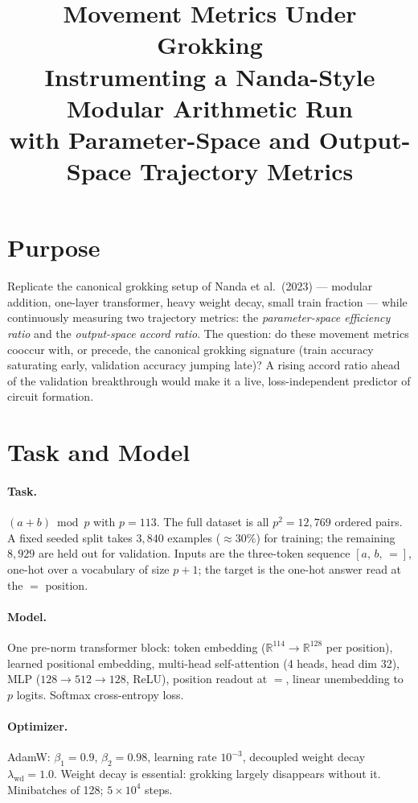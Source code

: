 \documentclass[11pt]{article}
\title{Movement Metrics Under Grokking\\[0.4em]
\large Instrumenting a Nanda-Style Modular Arithmetic Run\\
with Parameter-Space and Output-Space Trajectory Metrics}
\author{}
\date{}
\begin{document}
\maketitle

\section*{Purpose}

Replicate the canonical grokking setup of Nanda et al.\ (2023) --- modular addition,
one-layer transformer, heavy weight decay, small train fraction --- while continuously
measuring two trajectory metrics: the \emph{parameter-space efficiency ratio} and the
\emph{output-space accord ratio}. The question: do these movement metrics cooccur with,
or precede, the canonical grokking signature (train accuracy saturating early, validation
accuracy jumping late)? A rising accord ratio ahead of the validation breakthrough would
make it a live, loss-independent predictor of circuit formation.

\section{Task and Model}

\paragraph{Task.} $(a + b) \bmod p$ with $p = 113$. The full dataset is all $p^2 = 12{,}769$
ordered pairs. A fixed seeded split takes $3{,}840$ examples ($\approx 30\%$) for training;
the remaining $8{,}929$ are held out for validation. Inputs are the three-token sequence
$[a,\, b,\, =]$, one-hot over a vocabulary of size $p + 1$; the target is the one-hot answer
read at the $=$ position.

\paragraph{Model.} One pre-norm transformer block:
token embedding ($\mathbb{R}^{114} \to \mathbb{R}^{128}$ per position), learned positional
embedding, multi-head self-attention (4 heads, head dim 32), MLP ($128 \to 512 \to 128$, ReLU),
position readout at $=$, linear unembedding to $p$ logits. Softmax cross-entropy loss.

\paragraph{Optimizer.} AdamW: $\beta_1 = 0.9$, $\beta_2 = 0.98$, learning rate $10^{-3}$,
decoupled weight decay $\lambda_{\mathrm{wd}} = 1.0$. Weight decay is essential: grokking
largely disappears without it. Minibatches of 128; $5 \times 10^4$ steps.
\end{document}
